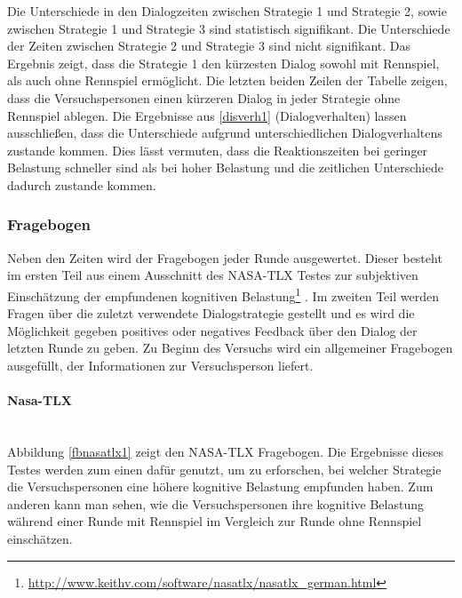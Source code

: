 \documentclass[12pt,a4paper]{scrartcl}
\begin{document}
Die Unterschiede in den Dialogzeiten zwischen Strategie 1 und Strategie 2, sowie zwischen Strategie 1 und Strategie 3 sind statistisch signifikant. Die Unterschiede der Zeiten zwischen Strategie 2 und Strategie 3 sind nicht signifikant. Das Ergebnis zeigt, dass die Strategie 1 den kürzesten Dialog sowohl mit Rennspiel, als auch ohne Rennspiel ermöglicht. Die letzten beiden Zeilen der Tabelle zeigen, dass die Versuchspersonen einen kürzeren Dialog in jeder Strategie ohne Rennspiel ablegen. Die Ergebnisse aus \ref{disverh1} (Dialogverhalten) lassen ausschließen, dass die Unterschiede aufgrund unterschiedlichen Dialogverhaltens zustande kommen. Dies lässt vermuten, dass die Reaktionszeiten bei geringer Belastung schneller sind als bei hoher Belastung und die zeitlichen Unterschiede dadurch zustande kommen. 
\subsubsection{Fragebogen}
\label{fragebogen1}
Neben den Zeiten wird der Fragebogen jeder Runde ausgewertet. Dieser besteht im ersten Teil aus einem Ausschnitt des NASA-TLX Testes zur subjektiven Einschätzung der empfundenen kognitiven Belastung\footnote{\label{foot:nasatlx1}\url{http://www.keithv.com/software/nasatlx/nasatlx_german.html}} . Im zweiten Teil werden Fragen über die zuletzt verwendete Dialogstrategie gestellt und es wird die Möglichkeit gegeben positives oder negatives Feedback über den Dialog der letzten Runde zu geben. Zu Beginn des Versuchs wird ein allgemeiner Fragebogen ausgefüllt, der Informationen zur Versuchsperson liefert. 
\paragraph{Nasa-TLX}
~\\
Abbildung \ref{fbnasatlx1} zeigt den NASA-TLX Fragebogen. 
Die Ergebnisse dieses Testes werden zum einen dafür genutzt, um zu erforschen, bei welcher Strategie die Versuchspersonen eine höhere kognitive Belastung empfunden haben. Zum anderen kann man sehen, wie die Versuchspersonen ihre kognitive Belastung während einer Runde mit Rennspiel im Vergleich zur Runde ohne Rennspiel einschätzen. 
\end{document}
